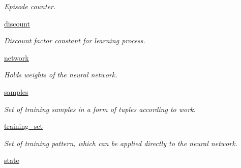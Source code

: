 \begin{DoxyCompactItemize}
\begin{DoxyCompactList}\small\item\em Episode counter. \end{DoxyCompactList}\item 
\hypertarget{class_n_f_q_1_1_n_f_q_a97746837457f12b6a4277c3d459a1b1d}{\hyperlink{class_n_f_q_1_1_n_f_q_a97746837457f12b6a4277c3d459a1b1d}{discount}}\label{class_n_f_q_1_1_n_f_q_a97746837457f12b6a4277c3d459a1b1d}

\begin{DoxyCompactList}\small\item\em Discount factor constant for learning process. \end{DoxyCompactList}\item 
\hypertarget{class_n_f_q_1_1_n_f_q_a6b288a470bcb2fd5f321915ef4045b8b}{\hyperlink{class_n_f_q_1_1_n_f_q_a6b288a470bcb2fd5f321915ef4045b8b}{network}}\label{class_n_f_q_1_1_n_f_q_a6b288a470bcb2fd5f321915ef4045b8b}

\begin{DoxyCompactList}\small\item\em Holds weights of the neural network. \end{DoxyCompactList}\item 
\hypertarget{class_n_f_q_1_1_n_f_q_a95accbf9778b78efc6b4605f4d909eb8}{\hyperlink{class_n_f_q_1_1_n_f_q_a95accbf9778b78efc6b4605f4d909eb8}{samples}}\label{class_n_f_q_1_1_n_f_q_a95accbf9778b78efc6b4605f4d909eb8}

\begin{DoxyCompactList}\small\item\em Set of training samples in a form of tuples according to work. \end{DoxyCompactList}\item 
\hypertarget{class_n_f_q_1_1_n_f_q_ab87fb1dc8a9c886db84a2fa17729eaf9}{\hyperlink{class_n_f_q_1_1_n_f_q_ab87fb1dc8a9c886db84a2fa17729eaf9}{training\+\_\+set}}\label{class_n_f_q_1_1_n_f_q_ab87fb1dc8a9c886db84a2fa17729eaf9}

\begin{DoxyCompactList}\small\item\em Set of training pattern, which can be applied directly to the neural network. \end{DoxyCompactList}\item 
\hypertarget{class_n_f_q_1_1_n_f_q_adc6e5733fc3c22f0a7b2914188c49c90}{\hyperlink{class_n_f_q_1_1_n_f_q_adc6e5733fc3c22f0a7b2914188c49c90}{state}}\label{class_n_f_q_1_1_n_f_q_adc6e5733fc3c22f0a7b2914188c49c90}


\end{DoxyCompactItemize}
